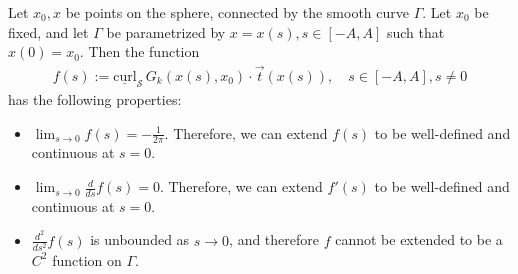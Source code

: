 \documentclass[final]{siamltex}
\renewcommand{\S} {\mathcal{S}}
\begin{document}
\begin{lemma}
\label{regularity}
Let $x_0,x$ be points on the sphere, connected by the smooth curve
$\Gamma$. Let $x_0$ be fixed, and let $\Gamma$ be parametrized by
$x=x(s), s\in[-A,A]$ such that $x(0)=x_{0}$. Then the function 
\begin{align*}
  f(s):=\underline{\mbox{curl}}_{\S}\,
    G_k(x(s),x_0)\cdot\vec{t}(x(s)), \quad s\in[-A,A], s \neq 0
\end{align*}
has the following properties:
\begin{itemize}
\item $\lim_{s\rightarrow 0} f(s) = -\frac{1}{2\pi}$.
Therefore, we can extend $f(s)$ to be well-defined and continuous at
$s=0$.
\item $\lim_{s\rightarrow 0} \frac{d}{ds}f(s) =  0$.
Therefore, we can extend $f'(s)$ to be well-defined and continuous at
$s=0$. 
\item $ \frac{d^2}{ds^2} f(s)$ is unbounded as $s\rightarrow 0$, and therefore $f$ cannot be extended to be a $C^2$ function on $\Gamma$.

\end{itemize}
\end{lemma}
\end{document}
